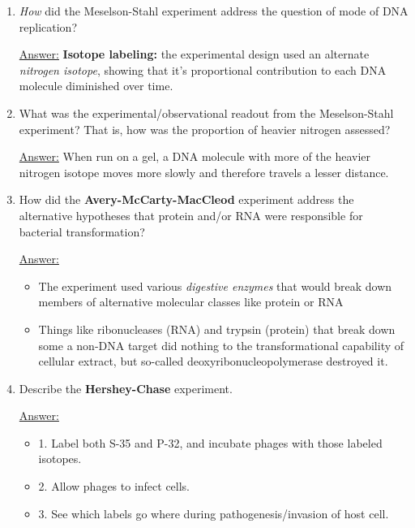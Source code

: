 \documentclass{article}
\newenvironment{QandA}{\begin{enumerate}[label=\bfseries Q\arabic*.]}
                       {\end{enumerate}}
\newenvironment{answered}{\par\normalfont\underline{Answer:}}{}
\begin{document}
\begin{QandA}
    \begin{answered}
    The \textbf{{Meselson-Stahl} experiment} addressed the \textit{\textbf{mode} of DNA replication,} demonstrating that it's \textbf{semiconservative.}
    \end{answered}
  \item{\textit{How} did the Meselson-Stahl experiment address the question of mode of DNA replication?}
    \begin{answered}
    \textbf{Isotope labeling:} the experimental design used an alternate \textit{nitrogen isotope}, showing that it's proportional contribution to each DNA molecule diminished over time.
    \end{answered}
  \item{What was the experimental/observational readout from the Meselson-Stahl experiment? That is, how was the proportion of heavier nitrogen assessed?}
    \begin{answered}
    When run on a gel, a DNA molecule with more of the heavier nitrogen isotope moves more slowly and therefore travels a lesser distance.
    \end{answered}
  \item{How did the \textbf{Avery-McCarty-MacCleod} experiment address the alternative hypotheses that protein and/or RNA were responsible for bacterial transformation?}
    \begin{answered}
    \begin{itemize}
      \item{The experiment used various \textit{digestive enzymes} that would break down members of alternative molecular classes like protein or RNA}
      \item{Things like ribonucleases (RNA) and trypsin (protein) that break down some a non-DNA target did nothing to the transformational capability of cellular extract, but so-called deoxyribonucleopolymerase destroyed it.}
    \end{itemize}
    \end{answered}
  \item{Describe the \textbf{Hershey-Chase} experiment.}
    \begin{answered}
    \begin{itemize}
      \item{1. Label both S-35 and P-32, and incubate phages with those labeled isotopes.}
      \item{2. Allow phages to infect cells.}
      \item{3. See which labels go where during pathogenesis/invasion of host cell.}

\end{itemize}
\end{answered}
\end{QandA}
\end{document}
